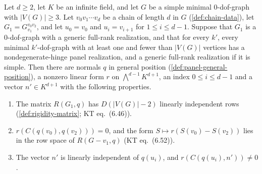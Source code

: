 \begin{lemma}
  \label{lem:case-III-chain-discriminator}
  \leanok
  Let $d \ge 2$, let $K$ be an infinite field, and let $G$ be a simple
  minimal $0$-dof-graph with $|V(G)| \ge 3$. Let $v_0 v_1 \cdots v_d$ be
  a chain of length $d$ in $G$ (\cref{def:chain-data}), let
  $G_1 = G_{v_1}^{v_0 v_2}$, and let $u_0 = v_0$ and $u_i = v_{i+1}$ for
  $1 \le i \le d - 1$. Suppose that $G_1$ is a $0$-dof-graph with a
  generic full-rank realization, and that for every $k'$, every minimal
  $k'$-dof-graph with at least one and fewer than $|V(G)|$ vertices has
  a nondegenerate-hinge panel realization, and a generic full-rank
  realization if it is simple. Then there are normals $q$ in general
  position (\cref{def:panel-general-position}), a nonzero linear form $r$
  on $\bigwedge^{d-1} K^{d+1}$, an index $0 \le i \le d - 1$ and a
  vector $n' \in K^{d+1}$ with the following properties.
  \begin{enumerate}
    \item The matrix $R(G_1, q)$ has $D(|V(G)| - 2)$ linearly independent
      rows (\cref{def:rigidity-matrix}; KT eq.~(6.46)).
    \item $r(C(q(v_0), q(v_2))) = 0$, and the form
      $S \mapsto r(S(v_0) - S(v_2))$ lies in the row space of
      $R(G - v_1, q)$ (KT eq.~(6.52)).
    \item The vector $n'$ is linearly independent of $q(u_i)$, and
      $r(C(q(u_i), n')) \neq 0$.
  \end{enumerate}
\end{lemma}
